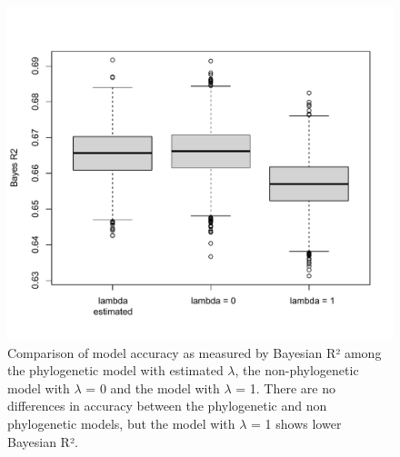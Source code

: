\documentclass{article}\usepackage[]{graphicx}\usepackage[]{color}
\begin{document}
\begin{figure} [H]
  \begin{center}
  \includegraphics[width=14cm]{../../analyses/phylogeny/figures/Boxplot_bayesR2.pdf}
  \caption{Comparison of model accuracy as measured by Bayesian R² among the phylogenetic model with estimated $\lambda$, the non-phylogenetic model with $\lambda$ = 0 and the model with $\lambda$ = 1. There are no differences in accuracy between the phylogenetic and non phylogenetic models, but the model with $\lambda$ = 1 shows lower Bayesian R².}
  \label{fig:bayesr2}
  \end{center}
\end{figure}



\pagebreak
%
\end{document}
